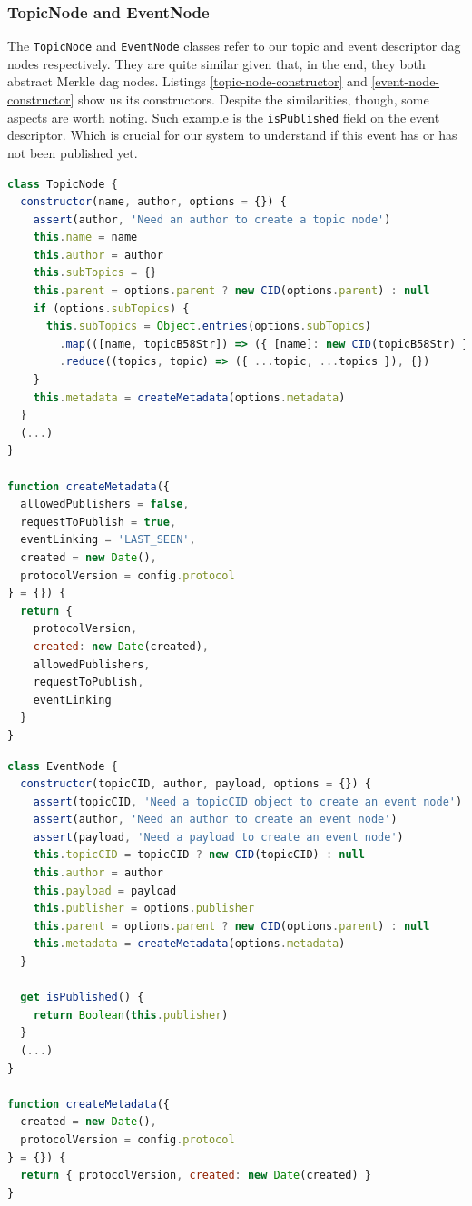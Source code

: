 \subsubsection{TopicNode and EventNode}\label{subsubsec:topic-node}

The \verb|TopicNode| and \verb|EventNode| classes refer to our topic and event
descriptor dag nodes respectively. They are quite similar given that, in the
end, they both abstract Merkle \acrshort{dag} nodes. Listings \ref{topic-node-constructor}
and \ref{event-node-constructor} show us its constructors. Despite the
similarities, though, some aspects are worth noting. Such example is the
\verb|isPublished| field on the event descriptor. Which is crucial for our
system to understand if this event has or has not been published yet.

\begin{lstlisting}[language=JavaScript, float=p, caption={TopicNode class constructor},label={topic-node-constructor}]
class TopicNode {
  constructor(name, author, options = {}) {
    assert(author, 'Need an author to create a topic node')
    this.name = name
    this.author = author
    this.subTopics = {}
    this.parent = options.parent ? new CID(options.parent) : null
    if (options.subTopics) {
      this.subTopics = Object.entries(options.subTopics)
        .map(([name, topicB58Str]) => ({ [name]: new CID(topicB58Str) }))
        .reduce((topics, topic) => ({ ...topic, ...topics }), {})
    }
    this.metadata = createMetadata(options.metadata)
  }
  (...)
}

function createMetadata({
  allowedPublishers = false,
  requestToPublish = true,
  eventLinking = 'LAST_SEEN',
  created = new Date(),
  protocolVersion = config.protocol
} = {}) {
  return {
    protocolVersion,
    created: new Date(created),
    allowedPublishers,
    requestToPublish,
    eventLinking
  }
}
\end{lstlisting}

\begin{lstlisting}[language=JavaScript, float=p, caption={EventNode class constructor},label={event-node-constructor}]
class EventNode {
  constructor(topicCID, author, payload, options = {}) {
    assert(topicCID, 'Need a topicCID object to create an event node')
    assert(author, 'Need an author to create an event node')
    assert(payload, 'Need a payload to create an event node')
    this.topicCID = topicCID ? new CID(topicCID) : null
    this.author = author
    this.payload = payload
    this.publisher = options.publisher
    this.parent = options.parent ? new CID(options.parent) : null
    this.metadata = createMetadata(options.metadata)
  }

  get isPublished() {
    return Boolean(this.publisher)
  }
  (...)
}

function createMetadata({
  created = new Date(),
  protocolVersion = config.protocol
} = {}) {
  return { protocolVersion, created: new Date(created) }
}

\end{lstlisting}

